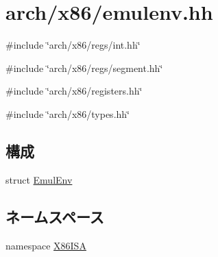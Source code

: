 \hypertarget{emulenv_8hh}{
\section{arch/x86/emulenv.hh}
\label{emulenv_8hh}
}
{\ttfamily \#include \char`\"{}arch/x86/regs/int.hh\char`\"{}}\par
{\ttfamily \#include \char`\"{}arch/x86/regs/segment.hh\char`\"{}}\par
{\ttfamily \#include \char`\"{}arch/x86/registers.hh\char`\"{}}\par
{\ttfamily \#include \char`\"{}arch/x86/types.hh\char`\"{}}\par
\subsection*{構成}
\begin{DoxyCompactItemize}
\item 
struct \hyperlink{structX86ISA_1_1EmulEnv}{EmulEnv}
\end{DoxyCompactItemize}
\subsection*{ネームスペース}
\begin{DoxyCompactItemize}
\item 
namespace \hyperlink{namespaceX86ISA}{X86ISA}
\end{DoxyCompactItemize}
